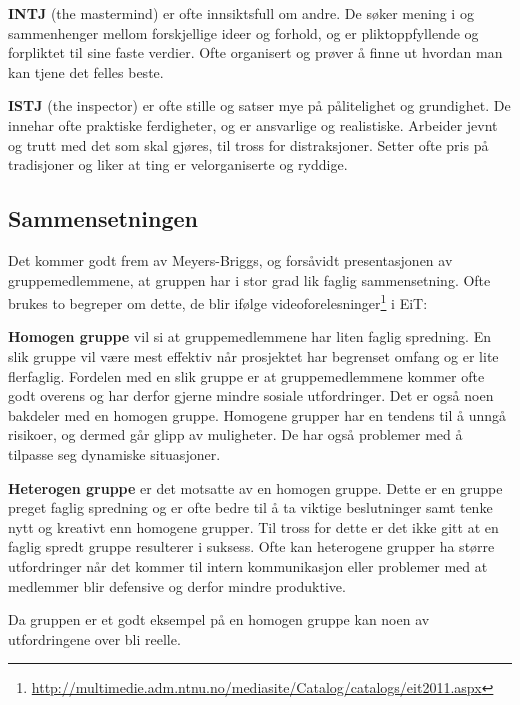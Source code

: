 \textbf{INTJ} (the mastermind) er ofte innsiktsfull om andre. 
De søker mening i og sammenhenger mellom forskjellige ideer og forhold, og er pliktoppfyllende og forpliktet til sine faste verdier. 
Ofte organisert og prøver å finne ut hvordan man kan tjene det felles beste. 

\textbf{ISTJ} (the inspector) er ofte stille og satser mye på pålitelighet og grundighet. 
De innehar ofte praktiske ferdigheter, og er ansvarlige og realistiske. 
Arbeider jevnt og trutt med det som skal gjøres, til tross for distraksjoner. 
Setter ofte pris på tradisjoner og liker at ting er velorganiserte og ryddige. 

\subsection{Sammensetningen}
Det kommer godt frem av Meyers-Briggs, og forsåvidt presentasjonen av gruppemedlemmene, at gruppen har i stor grad lik faglig sammensetning.
Ofte brukes to begreper om dette, de blir ifølge videoforelesninger\footnote{\url{http://multimedie.adm.ntnu.no/mediasite/Catalog/catalogs/eit2011.aspx}} i EiT: 
\vspace{\secspace}

\textbf{Homogen gruppe} vil si at gruppemedlemmene har liten faglig spredning. 
En slik gruppe vil være mest effektiv når prosjektet har begrenset omfang og er lite flerfaglig. 
Fordelen med en slik gruppe er at gruppemedlemmene kommer ofte godt overens og har derfor gjerne mindre sosiale utfordringer. 
Det er også noen bakdeler med en homogen gruppe. 
Homogene grupper har en tendens til å unngå risikoer, og dermed går glipp av muligheter. 
De har også problemer med å tilpasse seg dynamiske situasjoner.
\vspace{\secspace}

\textbf{Heterogen gruppe} er det motsatte av en homogen gruppe. 
Dette er en gruppe preget faglig spredning og er ofte bedre til å ta viktige beslutninger samt tenke nytt og kreativt enn homogene grupper. 
Til tross for dette er det ikke gitt at en faglig spredt gruppe resulterer i suksess. 
Ofte kan heterogene grupper ha større utfordringer når det kommer til intern kommunikasjon eller problemer med at medlemmer blir defensive og derfor mindre produktive. 
\vspace{\secspace}

Da gruppen er et godt eksempel på en homogen gruppe kan noen av utfordringene over bli reelle.
